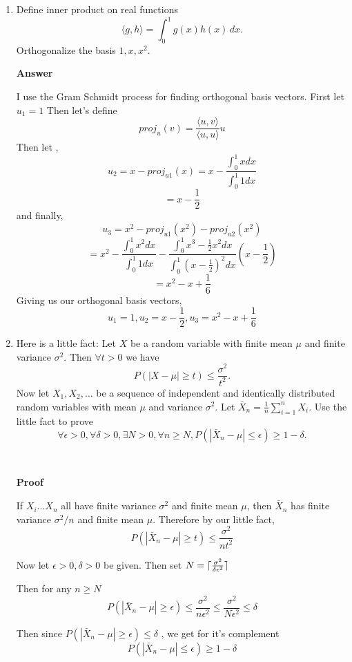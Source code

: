 \documentclass{article}
\DeclarePairedDelimiter{\ceil}{\lceil}{\rceil}
\begin{document}
\begin{enumerate}

\item Define inner product on real functions
$$\langle g, h \rangle = \int_0^1 g(x)h(x)\,dx.$$
Orthogonalize the basis $1, x, x^2$.

\textbf{Answer}

I use the Gram Schmidt process for finding orthogonal basis vectors.
First let $u_1 = 1$
Then let's define
\[
proj_u(v) = \frac{\langle u , v \rangle}{\langle u , u \rangle }u
\]
Then let ,
\[
u_2 = x - proj_{u1}(x) = x - \frac{\int_{0}^{1}x dx}{\int_{0}^{1}1 dx}
\]
\[
= x - \frac{1}{2}
\]
and finally, 
\[
u_3 = x^2 - proj_{u1}(x^2) - proj_{u2}(x^2)
\]
\[
= x^2 - \frac{\int_{0}^{1}x^2 dx}{\int_{0}^{1}1 dx} - \frac{\int_{0}^{1} x^3 - \frac{1}{2}x^2 dx}{\int_0^1 (x-\frac{1}{2})^2 dx} (x-\frac{1}{2})
\]
\[
= x^2 - x + \frac{1}{6}
\]
Giving us our orthogonal basis vectors,
\[
u_1 = 1, u_2 = x-\frac{1}{2}, u_3 = x^2 - x + \frac{1}{6}
\]

\item Here is a little fact: Let $X$ be a random variable with finite mean $\mu$ and finite variance $\sigma^2$.  Then $\forall t>0$ we have
$$P(|X-\mu| \ge t) \le \frac{\sigma^2}{t^2}.$$
Now let $X_1, X_2, \ldots$ be a sequence of independent and identically distributed random variables with mean $\mu$ and variance $\sigma^2$.
Let $\bar{X}_n = \frac{1}{n}\sum_{i=1}^n X_i$.
Use the little fact to prove 
$$\forall \epsilon>0, \forall \delta>0, \exists N>0, \forall n\ge N, P(|\bar{X}_n - \mu|\le \epsilon)\ge 1-\delta.$$

\

\textbf{Proof}

If $X_i ... X_n$ all have finite variance $\sigma^2$ and finite mean $\mu$, then $\bar{X}_n$ has finite variance $\sigma^2/n$ and finite mean $\mu$. Therefore by our little fact,
\[
P(|\bar{X}_n - \mu| \geq t) \leq \frac{\sigma^2}{nt^2}
\]

Now let $\epsilon > 0, \delta > 0$ be given. 
Then set $N = \ceil{\frac{\sigma^2}{\delta\epsilon^2}}$

Then for any $n \geq N$
\[
P(|\bar{X}_n - \mu| \geq \epsilon) \leq \frac{\sigma^2}{n\epsilon^2} \leq \frac{\sigma^2}{N\epsilon^2} \leq \delta
\]

Then since $P(|\bar{X}_n - \mu| \geq \epsilon) \leq \delta$ , we get for it's complement
\[
P(|\bar{X}_n - \mu| \leq \epsilon) \geq 1 - \delta
\]

\end{enumerate}
\end{document}
